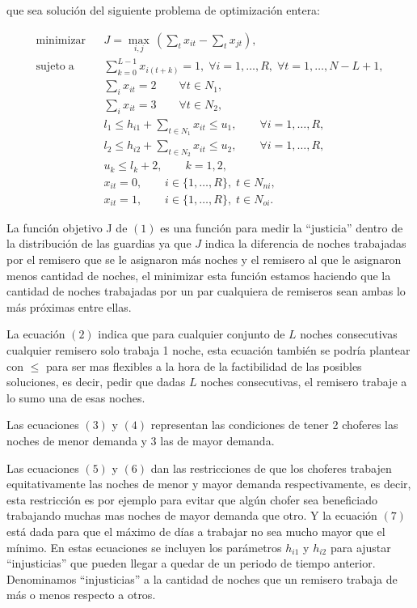 \documentclass[12pt]{article}
\begin{document}
que sea solución del siguiente problema de optimización entera:

\begin{eqnarray}
 \mathrm{minimizar}& & \displaystyle{J=\max_{i,j}\, \left(\sum_t x_{it}-\sum_t x_{jt}\right)},\\
 \mathrm{sujeto\;a }& & \sum_{k=0}^{L-1} x_{i(t+k)}=1,\;\forall i=1,\ldots,R,\;\forall t=1,\ldots,N-L+1,\\ 
 & & \sum_i x_{it} = 2 \qquad \forall t\in N_1,\\
 & & \sum_i x_{it} = 3 \qquad \forall t\in N_2,\\
 & & l_1 \leq h_{i1}+\sum_{t\in N_1} x_{it}\leq u_1, \qquad \forall i=1,\ldots,R,\\
 & & l_2 \leq h_{i2}+\sum_{t\in N_2} x_{it}\leq u_2,\qquad \forall i=1,\ldots,R,\\
 & & u_k \leq l_k + 2,\qquad k=1,2,\\
 & & x_{it} = 0,\qquad i\in\{1,\ldots,R\},\;t\in N_{ni},\\
 & & x_{it} = 1,\qquad i\in\{1,\ldots,R\},\;t\in N_{oi}.
\end{eqnarray}

La función objetivo J de $(1)$ es una función para medir la ``justicia'' dentro de la distribución de las guardias ya que $J$ indica la diferencia de noches trabajadas por el remisero que se le asignaron más noches y el remisero al que le asignaron menos cantidad de noches, el minimizar esta función estamos haciendo que la cantidad de noches trabajadas por un par cualquiera de remiseros sean ambas lo más próximas entre ellas.

La ecuación $(2)$ indica que para cualquier conjunto de $L$ noches consecutivas cualquier remisero solo trabaja 1 noche, esta ecuación también se podría plantear con $\leq$ para ser mas flexibles a la hora de la factibilidad de las posibles soluciones, es decir, pedir que dadas $L$ noches consecutivas, el remisero trabaje a lo sumo una de esas noches.

Las ecuaciones $(3)$ y $(4)$ representan las condiciones de tener 2 choferes las noches de menor demanda y 3 las de mayor demanda.

Las ecuaciones $(5)$ y $(6)$ dan las restricciones de que los choferes trabajen equitativamente las noches de menor y mayor demanda respectivamente, es decir, esta restricción es por ejemplo para evitar que algún chofer sea beneficiado trabajando muchas mas noches de mayor demanda que otro. Y la ecuación $(7)$ está dada para que el máximo de días a trabajar no sea mucho mayor que el mínimo. En estas ecuaciones se incluyen los parámetros $h_{i1}$ y $h_{i2}$ para ajustar ``injusticias'' que pueden llegar a quedar de un periodo de tiempo anterior. Denominamos ``injusticias'' a la cantidad de noches que un remisero trabaja de más o menos respecto a otros.
\end{document}
